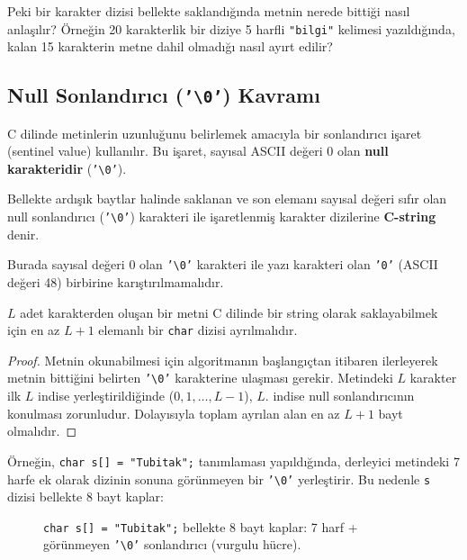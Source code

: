 Peki bir karakter dizisi bellekte saklandığında metnin nerede bittiği nasıl anlaşılır? Örneğin 20 karakterlik bir diziye 5 harfli \texttt{"bilgi"} kelimesi yazıldığında, kalan 15 karakterin metne dahil olmadığı nasıl ayırt edilir?

\subsection{Null Sonlandırıcı (\texttt{'\textbackslash 0'}) Kavramı}

C dilinde metinlerin uzunluğunu belirlemek amacıyla bir sonlandırıcı işaret (sentinel value) kullanılır. Bu işaret, sayısal ASCII değeri $0$ olan \textbf{null karakteridir} (\texttt{'\textbackslash 0'}).

\begin{definition}
Bellekte ardışık baytlar halinde saklanan ve son elemanı sayısal değeri sıfır olan null sonlandırıcı (\texttt{'\textbackslash 0'}) karakteri ile işaretlenmiş karakter dizilerine \textbf{C-string} denir.
\end{definition}

Burada sayısal değeri $0$ olan \texttt{'\textbackslash 0'} karakteri ile yazı karakteri olan \texttt{'0'} (ASCII değeri 48) birbirine karıştırılmamalıdır.

\begin{theorem}
$L$ adet karakterden oluşan bir metni C dilinde bir string olarak saklayabilmek için en az $L + 1$ elemanlı bir \texttt{char} dizisi ayrılmalıdır.
\end{theorem}

\begin{proof}
Metnin okunabilmesi için algoritmanın başlangıçtan itibaren ilerleyerek metnin bittiğini belirten \texttt{'\textbackslash 0'} karakterine ulaşması gerekir. Metindeki $L$ karakter ilk $L$ indise yerleştirildiğinde ($0, 1, \dots, L-1$), $L$. indise null sonlandırıcının konulması zorunludur. Dolayısıyla toplam ayrılan alan en az $L + 1$ bayt olmalıdır.
\end{proof}

Örneğin, \texttt{char s[] = "Tubitak";} tanımlaması yapıldığında, derleyici metindeki 7 harfe ek olarak dizinin sonuna görünmeyen bir \texttt{'\textbackslash 0'} yerleştirir. Bu nedenle \texttt{s} dizisi bellekte 8 bayt kaplar:
\begin{figure}[ht]
\centering
{}
\caption{\texttt{char s[] = "Tubitak";} bellekte 8 bayt kaplar: 7 harf + görünmeyen
\texttt{'\textbackslash 0'} sonlandırıcı (vurgulu hücre).}
\end{figure}

